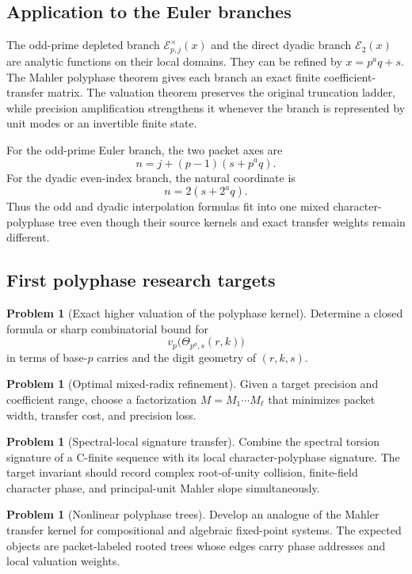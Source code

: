 \documentclass[11pt]{article}
\theoremstyle{definition}\newtheorem{definition}[theorem]{Definition}\newtheorem{example}[theorem]{Example}\newtheorem{construction}[theorem]{Construction}\newtheorem{algorithm}[theorem]{Algorithm}\newtheorem{conjecture}[theorem]{Conjecture}\newtheorem{problem}[theorem]{Problem}
\theoremstyle{remark}\newtheorem{remark}[theorem]{Remark}\newtheorem{boundary}[theorem]{Boundary}\newtheorem{certificate}[theorem]{Computational Certificate}\newtheorem{classical}[theorem]{Classical Input}\newtheorem{principle}[theorem]{Structural Principle}
\begin{document}
\subsection{Application to the Euler branches}
The odd-prime depleted branch $\mathscr E_{p,j}^\times(x)$ and the direct dyadic branch $\mathscr E_2(x)$ are analytic functions on their local domains. They can be refined by $x=p^aq+s$. The Mahler polyphase theorem gives each branch an exact finite coefficient-transfer matrix. The valuation theorem preserves the original truncation ladder, while precision amplification strengthens it whenever the branch is represented by unit modes or an invertible finite state.

For the odd-prime Euler branch, the two packet axes are
\[
 n=j+(p-1)(s+p^aq).
\]
For the dyadic even-index branch, the natural coordinate is
\[
 n=2(s+2^aq).
\]
Thus the odd and dyadic interpolation formulas fit into one mixed character-polyphase tree even though their source kernels and exact transfer weights remain different.

\subsection{First polyphase research targets}
\begin{problem}[Exact higher valuation of the polyphase kernel]
Determine a closed formula or sharp combinatorial bound for
\[
 v_p\bigl(\Theta_{p^a,s}(r,k)\bigr)
\]
in terms of base-$p$ carries and the digit geometry of $(r,k,s)$.
\end{problem}

\begin{problem}[Optimal mixed-radix refinement]
Given a target precision and coefficient range, choose a factorization $M=M_1\cdots M_\ell$ that minimizes packet width, transfer cost, and precision loss.
\end{problem}

\begin{problem}[Spectral-local signature transfer]
Combine the spectral torsion signature of a C-finite sequence with its local character-polyphase signature. The target invariant should record complex root-of-unity collision, finite-field character phase, and principal-unit Mahler slope simultaneously.
\end{problem}

\begin{problem}[Nonlinear polyphase trees]
Develop an analogue of the Mahler transfer kernel for compositional and algebraic fixed-point systems. The expected objects are packet-labeled rooted trees whose edges carry phase addresses and local valuation weights.
\end{problem}
\end{document}
